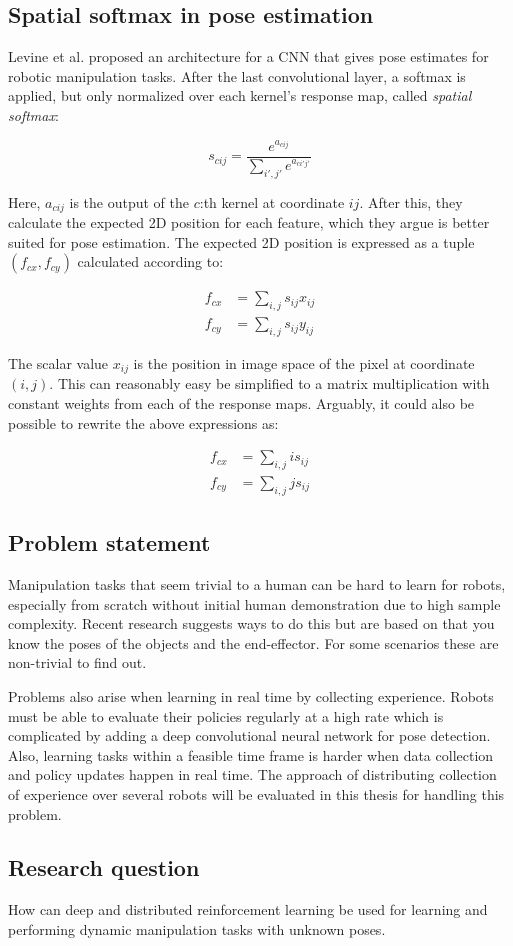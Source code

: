 \subsection{Spatial softmax in pose estimation}

Levine et al. \cite{levine2016end} proposed an architecture for a CNN that
gives pose estimates for robotic manipulation tasks. After the last
convolutional layer, a softmax is applied, but only normalized over each
kernel's response map, called \textit{spatial softmax}:

\begin{equation}
    s_{cij} = \frac{e^{a_{cij}}}{\sum_{i',j'} e^{a_{ci'j'}}}
\end{equation}

Here, $a_{cij}$ is the output of the $c$:th kernel at coordinate $ij$. After
this, they calculate the expected 2D position for each feature, which they
argue is better suited for pose estimation. The expected 2D position is
expressed as a tuple $(f_{cx}, f_{cy})$ calculated according to:

\begin{align}
    f_{cx} &= \sum_{i,j} s_{ij} x_{ij} \\
    f_{cy} &= \sum_{i,j} s_{ij} y_{ij}
\end{align}

The scalar value $x_{ij}$ is the position in image space of the pixel at coordinate
$(i, j)$. This can reasonably easy be simplified to a matrix multiplication with constant
weights from each of the response maps. Arguably, it could also be possible to rewrite the
above expressions as:

\begin{align}
    f_{cx} &= \sum_{i,j} i s_{ij} \\
    f_{cy} &= \sum_{i,j} j s_{ij}
\end{align}

\subsection{Problem statement}

Manipulation tasks that seem trivial to a human can be hard to learn for
robots, especially from scratch without initial human demonstration due to high
sample complexity. Recent research suggests ways to do this but are based on
that you know the poses of the objects and the end-effector. For some scenarios
these are non-trivial to find out.

Problems also arise when learning in real time by collecting experience. Robots
must be able to evaluate their policies regularly at a high rate which is
complicated by adding a deep convolutional neural network for pose detection.
Also, learning tasks within a feasible time frame is harder when data
collection and policy updates happen in real time. The approach of
distributing collection of experience over several robots will be evaluated in
this thesis for handling this problem.

\subsection{Research question}

How can deep and distributed reinforcement learning be used for learning and
performing dynamic manipulation tasks with unknown poses.
